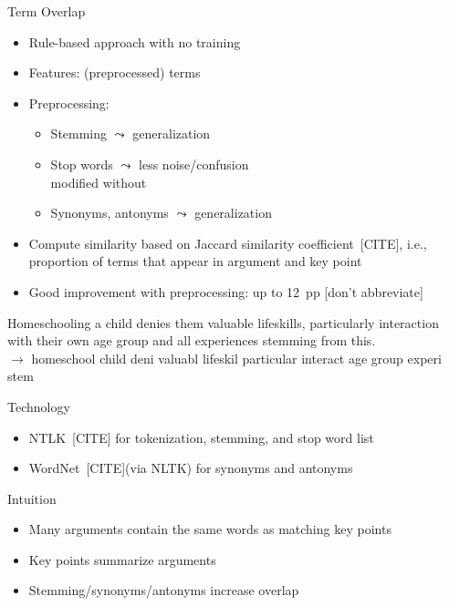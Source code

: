 \documentclass[english,handout]{mlutalk}
\newcommand{\todocite}{{\smaller\color{red}[CITE]}\xspace}
\newcommand{\todo}[1]{{\smaller\color{red}[#1]}}
\begin{document}
\begin{frame}[allowframebreaks]{Term Overlap}
  
  \begin{itemize}
    \item Rule-based approach with no training
    \item Features: (preprocessed) terms
    \item Preprocessing:
    \begin{itemize}
      \item Stemming \(\leadsto\) generalization
      \item Stop words \(\leadsto\) less noise/confusion \\ modified without 
      \item Synonyms, antonyms \(\leadsto\) generalization
    \end{itemize}
    \item Compute similarity based on Jaccard similarity coefficient~\todocite, i.e., proportion of terms that appear in argument and key point
    \item Good improvement with preprocessing: up to 12~pp \todo{don't abbreviate}
  \end{itemize}
  
  \begin{example}[Preprocessing]
    \smaller
    Homeschooling a child denies them valuable lifeskills, particularly interaction with their own age group and all experiences stemming from this. \\
    \(\to\) homeschool child deni valuabl lifeskil particular interact age group experi stem
  \end{example}

  \framebreak
  
  \begin{block}{Technology}
      \begin{itemize}
        \item NTLK~\todocite for tokenization, stemming,  and stop word list
        \item WordNet~\todocite (via NLTK) for synonyms and antonyms
      \end{itemize}
  \end{block}

  \begin{block}{Intuition}
    \begin{itemize}
      \item Many arguments contain the same words as matching key points
      \item Key points summarize arguments
      \item Stemming/synonyms/antonyms increase overlap
    \end{itemize}


\end{block}
\end{frame}
\end{document}
